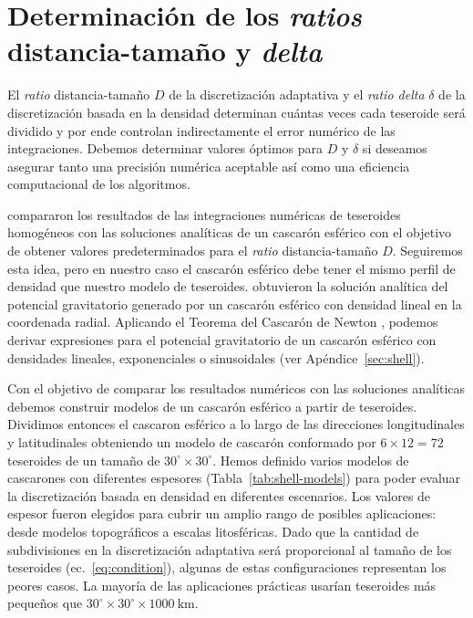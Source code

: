 
\section{Determinación de los \emph{ratios} distancia-tamaño y \emph{delta}}

El \emph{ratio} distancia-tamaño $D$ de la discretización adaptativa y el
\emph{ratio delta} $\delta$ de la discretización basada en la densidad
determinan cuántas veces cada teseroide será dividido y por ende controlan
indirectamente el error numérico de las integraciones.
Debemos determinar valores óptimos para $D$ y $\delta$ si deseamos asegurar
tanto una precisión numérica aceptable así como una eficiencia computacional de
los algoritmos.

\citet{uieda2016} compararon los resultados de las integraciones numéricas de
teseroides homogéneos con las soluciones analíticas de un cascarón esférico
\citep{mikuska2006, grombein2013} con el objetivo de obtener valores
predeterminados para el \emph{ratio} distancia-tamaño $D$.
Seguiremos esta idea, pero en nuestro caso el cascarón esférico debe tener el
mismo perfil de densidad que nuestro modelo de teseroides. \citet{lin2019}
obtuvieron la solución analítica del potencial gravitatorio generado por un
cascarón esférico con densidad lineal en la coordenada radial.
Aplicando el Teorema del Cascarón de Newton \citep{chandrasekhar1995,
binney2008}, podemos derivar expresiones para el potencial gravitatorio de un
cascarón esférico con densidades lineales, exponenciales o sinusoidales (ver
Apéndice~\ref{sec:shell}).

Con el objetivo de comparar los resultados numéricos con las soluciones
analíticas debemos construir modelos de un cascarón esférico a partir de
teseroides.
Dividimos entonces el cascaron esférico a lo largo de las direcciones
longitudinales y latitudinales obteniendo un modelo de cascarón conformado por
$6 \times 12 = 72$ teseroides de un tamaño de $30^\circ \times 30^\circ$.
Hemos definido varios modelos de cascarones con diferentes espesores
(Tabla~\ref{tab:shell-models}) para poder evaluar la discretización basada en
densidad en diferentes escenarios.
Los valores de espesor fueron elegidos para cubrir un amplio rango de
posibles aplicaciones: desde modelos topográficos a escalas litosféricas.
Dado que la cantidad de subdivisiones en la discretización adaptativa será
proporcional al tamaño de los teseroides (ec.~\ref{eq:condition}),
algunas de estas configuraciones representan los peores casos.
La mayoría de las aplicaciones prácticas usarían teseroides más pequeños que
$30^\circ \times 30^\circ \times 1000\ \text{km}$.

